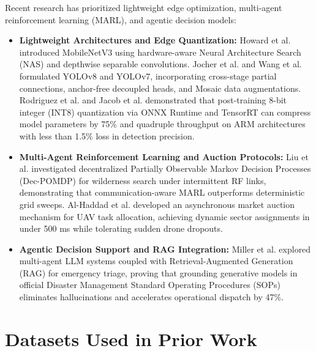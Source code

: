 Recent research has prioritized lightweight edge optimization, multi-agent reinforcement learning (MARL), and agentic decision models:
\begin{itemize}
    \item \textbf{Lightweight Architectures and Edge Quantization:} Howard et al. \cite{12} introduced MobileNetV3 using hardware-aware Neural Architecture Search (NAS) and depthwise separable convolutions. Jocher et al. \cite{14} and Wang et al. \cite{13} formulated YOLOv8 and YOLOv7, incorporating cross-stage partial connections, anchor-free decoupled heads, and Mosaic data augmentations. Rodriguez et al. \cite{3} and Jacob et al. \cite{15} demonstrated that post-training 8-bit integer (INT8) quantization via ONNX Runtime and TensorRT can compress model parameters by 75\% and quadruple throughput on ARM architectures with less than 1.5\% loss in detection precision.
    \item \textbf{Multi-Agent Reinforcement Learning and Auction Protocols:} Liu et al. \cite{1} investigated decentralized Partially Observable Markov Decision Processes (Dec-POMDP) for wilderness search under intermittent RF links, demonstrating that communication-aware MARL outperforms deterministic grid sweeps. Al-Haddad et al. \cite{2} developed an asynchronous market auction mechanism for UAV task allocation, achieving dynamic sector assignments in under 500 ms while tolerating sudden drone dropouts.
    \item \textbf{Agentic Decision Support and RAG Integration:} Miller et al. \cite{4} explored multi-agent LLM systems coupled with Retrieval-Augmented Generation (RAG) \cite{24} for emergency triage, proving that grounding generative models in official Disaster Management Standard Operating Procedures (SOPs) \cite{25} eliminates hallucinations and accelerates operational dispatch by 47\%.
\end{itemize}

\section{Datasets Used in Prior Work}

